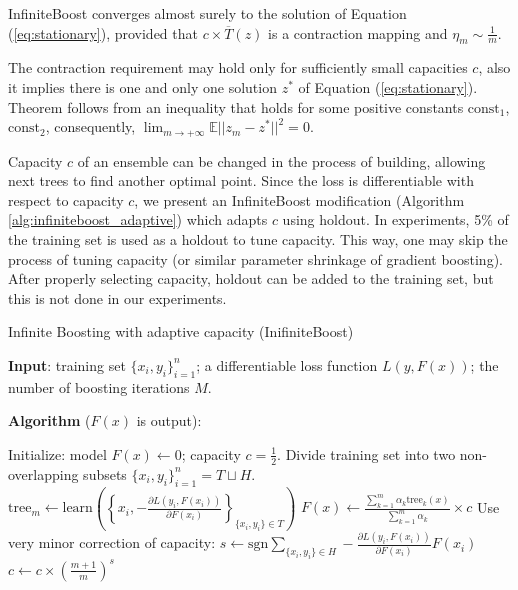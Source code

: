 
\begin{theorem}
InfiniteBoost converges almost surely to the solution of Equation (\ref{eq:stationary}),
provided that $c \times \overline{T}(z)$ is a contraction mapping and
$\eta_m \sim \frac{1}{m}$.
\end{theorem}

The contraction requirement may hold only for sufficiently small capacities $c$,
also it implies there is one and only one solution $z^{*}$ of Equation (\ref{eq:stationary}).
Theorem follows from an inequality
that holds for some positive constants $\text{const}_1$, $\text{const}_2$,
consequently, $\lim_{m \to +\infty} \mathbb{E} || z_{m} - z^{*} ||^2 = 0$.

Capacity $c$ of an ensemble can be changed in the process of building,
allowing next trees to find another optimal point.
Since the loss is differentiable with respect to capacity $c$,
we present an InfiniteBoost modification (Algorithm \ref{alg:infiniteboost_adaptive}) which adapts $c$ using holdout.
In experiments, 5\% of the training set is used as a holdout to tune capacity.
This way, one may skip the process of tuning capacity (or similar parameter shrinkage of gradient boosting).
After properly selecting capacity, holdout can be added to the training set, but this is not done in our experiments.

\begin{algorithm}[!h]
  \caption{Infinite Boosting with adaptive capacity (InifiniteBoost)}\label{alg:infiniteboost_adaptive}
  {\bf Input}: training set $\{x_i, y_i\}_{i=1}^n$; a differentiable loss function $L(y, F(x))$; the number of boosting iterations $M$.

  {\bf Algorithm} ($F(x)$ is output):
  \begin{algorithmic}
    \State Initialize: model $F(x) \gets 0$; capacity $c=\frac{1}{2}$.
    \State Divide training set into two non-overlapping subsets $\{x_i, y_i\}_{i=1}^n=T\sqcup H$.
      \State $\text{tree}_m \gets \text{learn}\left(\left\{x_i, -\frac{\partial L(y_i, F(x_i))}{\partial F(x_i)}\right\}_{\{x_i, y_i\}\in T}\right)$
      \State $F(x) \gets \frac{\sum_{k=1}^m \alpha_k \text{tree}_k(x)}{\sum_{k=1}^m \alpha_k} \times c$
      \State Use very minor correction of capacity:
      \State $s \gets \text{sgn} \sum_{\{x_i, y_i\}\in H} -\frac{\partial L(y_i, F(x_i))}{\partial F(x_i)} F(x_i)$
      \State $c \gets c\times \left(\frac{m+1}{m}\right)^s$
    \EndFor
  \end{algorithmic}
\end{algorithm}

